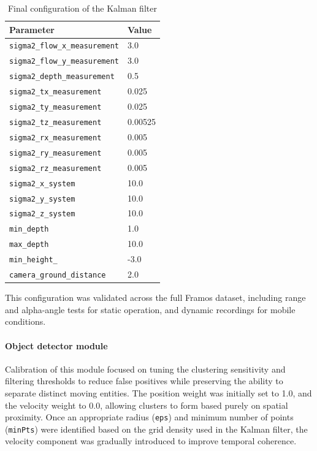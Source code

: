 \begin{table}[H]
  \centering
  \begin{tabular}{l l}
    \toprule
    \textbf{Parameter} & \textbf{Value} \\
    \midrule
    \texttt{sigma2\_flow\_x\_measurement} & 3.0 \\
    \texttt{sigma2\_flow\_y\_measurement} & 3.0 \\
    \texttt{sigma2\_depth\_measurement}  & 0.5 \\
    \texttt{sigma2\_tx\_measurement}     & 0.025 \\
    \texttt{sigma2\_ty\_measurement}     & 0.025 \\
    \texttt{sigma2\_tz\_measurement}     & 0.00525 \\
    \texttt{sigma2\_rx\_measurement}     & 0.005 \\
    \texttt{sigma2\_ry\_measurement}     & 0.005 \\
    \texttt{sigma2\_rz\_measurement}     & 0.005 \\
    \texttt{sigma2\_x\_system}           & 10.0 \\
    \texttt{sigma2\_y\_system}           & 10.0 \\
    \texttt{sigma2\_z\_system}           & 10.0 \\
    \texttt{min\_depth}                 & 1.0 \\
    \texttt{max\_depth}                 & 10.0 \\
    \texttt{min\_height\_}              & -3.0 \\
    \texttt{camera\_ground\_distance}   & 2.0 \\
    \bottomrule
  \end{tabular}
  \caption{Final configuration of the Kalman filter}\label{tab:kalman_filter_params}
\end{table}

This configuration was validated across the full Framos dataset, including 
range and alpha-angle tests for static operation, and dynamic recordings 
for mobile conditions. 


\paragraph{Object detector module}



Calibration of this module focused on tuning the clustering sensitivity 
and filtering thresholds to reduce false positives while preserving the 
ability to separate distinct moving entities. The position weight was 
initially set to 1.0, and the velocity weight to 0.0, allowing clusters to 
form based purely on spatial proximity. Once an appropriate radius 
(\texttt{eps}) and minimum number of points (\texttt{minPts}) were 
identified based on the grid density used in the Kalman filter, the 
velocity component was gradually introduced to improve temporal 
coherence.

